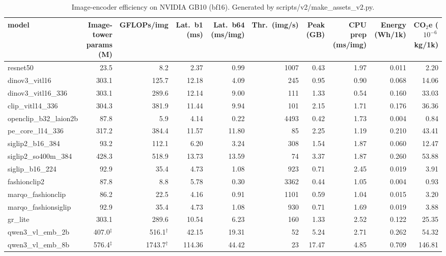 \begin{table}[t]\centering\small
\caption{Image-encoder efficiency on NVIDIA GB10 (bf16). Generated by scripts/v2/make\_assets\_v2.py.}\label{tab:v2-efficiency}
\begin{tabular}{lrrrrrrrrr}\toprule
model & Image-tower params (M) & GFLOPs/img & Lat.\ b1 (ms) & Lat.\ b64 (ms/img) & Thr.\ (img/s) & Peak (GB) & CPU prep (ms/img) & Energy (Wh/1k) & CO$_2$e ($10^{-6}$\,kg/1k) \\\midrule
resnet50 & 23.5 & 8.2 & 2.37 & 0.99 & 1007 & 0.43 & 1.97 & 0.011 & 2.20 \\
dinov3\_vitl16 & 303.1 & 125.7 & 12.18 & 4.09 & 245 & 0.95 & 0.90 & 0.068 & 14.06 \\
dinov3\_vitl16\_336 & 303.1 & 289.6 & 12.14 & 9.00 & 111 & 1.33 & 0.54 & 0.160 & 33.03 \\
clip\_vitl14\_336 & 304.3 & 381.9 & 11.44 & 9.94 & 101 & 2.15 & 1.71 & 0.176 & 36.36 \\
openclip\_b32\_laion2b & 87.8 & 5.9 & 4.14 & 0.22 & 4493 & 0.42 & 1.73 & 0.004 & 0.84 \\
pe\_core\_l14\_336 & 317.2 & 384.4 & 11.57 & 11.80 & 85 & 2.25 & 1.19 & 0.210 & 43.41 \\
siglip2\_b16\_384 & 93.2 & 112.1 & 6.20 & 3.24 & 308 & 1.54 & 1.87 & 0.060 & 12.47 \\
siglip2\_so400m\_384 & 428.3 & 518.9 & 13.73 & 13.59 & 74 & 3.37 & 1.87 & 0.260 & 53.88 \\
siglip\_b16\_224 & 92.9 & 35.4 & 4.73 & 1.08 & 923 & 0.71 & 2.45 & 0.019 & 3.91 \\
fashionclip2 & 87.8 & 8.8 & 5.78 & 0.30 & 3362 & 0.44 & 1.05 & 0.004 & 0.93 \\
marqo\_fashionclip & 86.2 & 22.5 & 4.16 & 0.91 & 1101 & 0.59 & 1.04 & 0.015 & 3.20 \\
marqo\_fashionsiglip & 92.9 & 35.4 & 4.73 & 1.08 & 930 & 0.71 & 1.69 & 0.019 & 3.88 \\
gr\_lite & 303.1 & 289.6 & 10.54 & 6.23 & 160 & 1.33 & 2.52 & 0.122 & 25.35 \\
qwen3\_vl\_emb\_2b & 407.0$^\ddagger$ & 516.1$^\dagger$ & 42.15 & 19.31 & 52 & 5.24 & 2.71 & 0.262 & 54.32 \\
qwen3\_vl\_emb\_8b & 576.4$^\ddagger$ & 1743.7$^\dagger$ & 114.36 & 44.42 & 23 & 17.47 & 4.85 & 0.709 & 146.81 \\
\bottomrule\end{tabular}
\par{}
\end{table}
